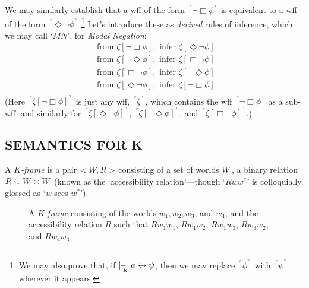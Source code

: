 \documentclass[landscape, two column, full page,reqno]{article}
\let\mathcal\relax
\newcommand{\mathcal}{\OMScal}%
\newcommand{\p}{\item}
\newcommand{\e}{\emph}
\newcommand{\fns}[1]{{\footnotesize #1}}
\newcommand{\qq}[1]{ ~\!^\ulcorner #1  ^\urcorner~\!}
\newcommand{\W}{\mathcal{W}}
\newcommand{\kproves}{\mid\hspace{-3.9pt}-_{\!\!\!\raisebox{-3pt}{\text{\tiny$K$}}}\hspace{3pt}}
\newcommand{\D}{\Diamond}
\newcommand{\B}{\Box}
\begin{document}
We may similarly establish that a wff of the form $\qq{\neg \B \phi}$ is equivalent to a wff of the form $\qq{\D \neg \phi}$.\footnote{ We may also prove that, if $\kproves \phi \leftrightarrow \psi$, then we may replace $\qq{\phi}$ with $\qq{\psi}$ wherever it appears.  }  Let's introduce these as \e{derived} rules of inference, which we may call `$MN$', for \e{Modal Negation}:
	\[\tag{$MN$}\label{mn}
		\begin{array}{l}
	\text{ from } \zeta[\neg \B \phi]  , \text{ infer } \zeta[\D \neg \phi] 	\\
	\text{ from } \zeta[\neg \D \phi]  , \text{ infer } \zeta[\B \neg \phi] 	\\
	\text{ from } \zeta[\B \neg \phi]  , \text{ infer } \zeta[\neg \D \phi] 	\\
	\text{ from } \zeta[ \D \neg \phi]  , \text{ infer } \zeta[\neg \B \phi] 	\\
		\end{array}
	\]
(Here $\qq{\zeta[\neg \B \phi]}$ is just any wff, $\qq{\zeta}$, which contains the wff $\qq{\neg \B \phi}$ as a sub-wff, and similarly for $\qq{\zeta[\D \neg \phi]}$, $\qq{\zeta[\neg \D \phi]}$, and $\qq{\zeta[\B \neg \phi]}$.)


\subsection{S\fns{EMANTICS} F\fns{OR} K}
\p A \e{$K$-frame} is a pair $<\W, R>$ consisting of a set of worlds $\W$, a binary relation $R \subseteq \W \times \W$ (known as the `accessibility relation'---though `$Rww^*$' is colloquially glossed as `$w$ sees $w^*$').  %
\begin{figure}[t]
\centering
{}

\caption{{\small A $K$-\e{frame} consisting of the worlds $w_1, w_2, w_3$, and $w_4$, and the accessibility relation $R$ such that $R w_1  w_1$, $R w_1 w_2$, $R w_1  w_3$, $R w_3  w_2$, and $R w_4  w_4$.}}\label{fig:frame1}
\end{figure}
\end{document}
